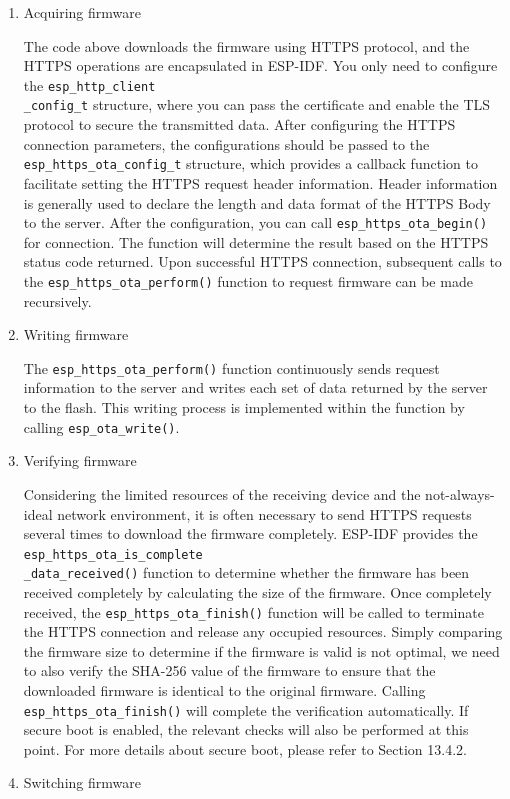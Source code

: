 \documentclass[a4paper,12pt,openany]{book}
\begin{document}
\vspace{6pt}
\begin{enumerate}[label=(\arabic*)]
    \item Acquiring firmware
    
    The code above downloads the firmware using HTTPS protocol, and the HTTPS operations are encapsulated in ESP-IDF. You only need to configure the \verb|esp_http_client|\\ \verb|_config_t| structure, where you can pass the certificate and enable the TLS protocol to secure the transmitted data. After configuring the HTTPS connection parameters, the configurations should be passed to the \verb|esp_https_ota_config_t| structure, which provides a callback function to facilitate setting the HTTPS request header information. Header information is generally used to declare the length and data format of the HTTPS Body to the server. After the configuration, you can call \verb|esp_https_ota_begin()| for connection. The function will determine the result based on the HTTPS status code returned. Upon successful HTTPS connection, subsequent calls to the \verb|esp_https_ota_perform()| function to request firmware can be made recursively.
    \item Writing firmware
    
    The \verb|esp_https_ota_perform()| function continuously sends request information to the server and writes each set of data returned by the server to the flash. This writing process is implemented within the function by calling \verb|esp_ota_write()|.
    \item Verifying firmware
    
    Considering the limited resources of the receiving device and the not-always-ideal network environment, it is often necessary to send HTTPS requests several times to download the firmware completely. ESP-IDF provides the \verb|esp_https_ota_is_complete|\\ \verb|_data_received()| function to determine whether the firmware has been received completely by calculating the size of the firmware. Once completely received, the \verb|esp_https_ota_finish()| function will be called to terminate the HTTPS connection and release any occupied resources. Simply comparing the firmware size to determine if the firmware is valid is not optimal, we need to also verify the SHA-256 value of the firmware to ensure that the downloaded firmware is identical to the original firmware. Calling \verb|esp_https_ota_finish()| will complete the verification automatically. If secure boot is enabled, the relevant checks will also be performed at this point. For more details about secure boot, please refer to Section 13.4.2.
    \item Switching firmware
    

\end{enumerate}
\end{document}
